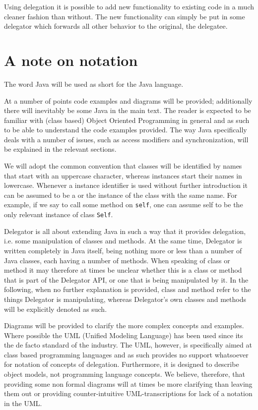 \documentclass[a4paper,12pt]{book}
\begin{document}
Using delegation it is possible to add new functionality to existing code in a much cleaner fashion than without. The new functionality can simply be put in some delegator which forwards all other behavior to the original, the delegatee.

\section*{A note on notation}
The word Java will be used as short for the Java language.

At a number of points code examples and diagrams will be provided; additionally there will inevitably be some Java in the main text. The reader is expected to be familiar with (class based) Object Oriented Programming in general and as such to be able to understand the code examples provided. The way Java specifically deals with a number of issues, such as access modifiers and synchronization, will be explained in the relevant sections. 

We will adopt the common convention that classes will be identified by names that start with an uppercase character, whereas instances start their names in lowercase. Whenever a instance identifier is used without further introduction it can be assumed to be a or the instance of the class with the same name. For example, if we say to call some method on \verb|self|, one can assume self to be the only relevant instance of class \verb|Self|.

Delegator is all about extending Java in such a way that it provides delegation, i.e. some manipulation of classes and methods. At the same time, Delegator is written completely in Java itself, being nothing more or less than a number of Java classes,  each having a number of methods. When speaking of class or method it may therefore at times be unclear whether this is a class or method that is part of the Delegator API, or one that is being manipulated by it. In the following, when no further explanation is provided, class and method refer to the things Delegator is manipulating, whereas Delegator's own classes and methods will be explicitly denoted as such.

Diagrams will be provided to clarify the more complex concepts and examples. Where possible the UML (Unified Modeling Language) has been used since its the de facto standard of the industry. The UML, however, is specifically aimed at class based programming languages and as such provides no support whatsoever for notation of concepts of delegation. Furthermore, it is designed to describe object models, not programming language concepts. We believe, therefore, that providing some non formal diagrams will at times be more clarifying than leaving them out or providing counter-intuitive UML-transcriptions for lack of a notation in the UML.
\end{document}
